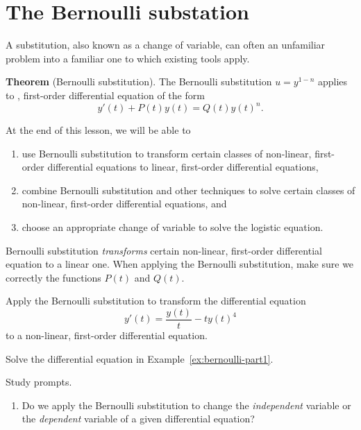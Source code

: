 \documentclass[../main.tex]{subfiles}
\begin{document}
 \section{The Bernoulli substation}

A substitution, also known as a change of variable, can often  an unfamiliar problem into a familiar one to which existing tools apply. 

\begin{mdframed}[style=simple-compact]
  \textbf{Theorem} (Bernoulli substitution). The Bernoulli substitution \(u = y^{1-n}\) applies to , first-order differential equation of the form
  \begin{equation} \label{eq:bernoulli}
    y'(t) + P(t) y(t) = Q(t) y(t)^{n}.
  \end{equation}
\end{mdframed}

\begin{objective}
  At the end of this lesson, we will be able to 
  \begin{enumerate}
    \item use Bernoulli substitution to transform certain classes of non-linear, first-order differential equations to linear, first-order differential equations,
    \item combine Bernoulli substitution and other techniques to solve certain classes of non-linear, first-order differential equations, and
    \item choose an appropriate change of variable to solve the logistic equation.
  \end{enumerate}
\end{objective}

Bernoulli substitution \emph{transforms} certain non-linear, first-order differential equation to a linear one.  When applying the Bernoulli substitution, make sure we correctly the functions \(P(t)\) and \(Q(t)\).

\begin{example} \label{ex:bernoulli-part1}
  Apply the Bernoulli substitution to transform the differential equation 
  \begin{equation} \label{eq:bernoulli-example-intro}
    y'(t) = \frac{y(t)}{t}  - t y(t)^{4}
  \end{equation}
  to a non-linear, first-order differential equation. 
\end{example}

\begin{example} \label{ex:bernoulli-part2}
  Solve the differential equation in Example~\ref{ex:bernoulli-part1}.
\end{example}

Study prompts.
\begin{enumerate}
  \item Do we apply the Bernoulli substitution to change the \emph{independent} variable or the \emph{dependent} variable of a given differential equation?
\end{enumerate}
\end{document}
